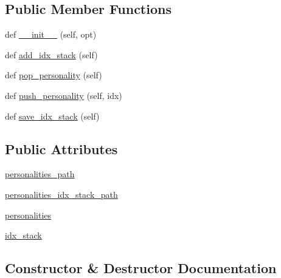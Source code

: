 \subsection*{Public Member Functions}
\begin{DoxyCompactItemize}
\item 
def \hyperlink{classpersonality__captions_1_1worlds_1_1PersonalityGenerator_a9964a939fc695387f9f3f4d30b8cea0f}{\+\_\+\+\_\+init\+\_\+\+\_\+} (self, opt)
\item 
def \hyperlink{classpersonality__captions_1_1worlds_1_1PersonalityGenerator_a78cf1854a907766176bd595a66e0b4c1}{add\+\_\+idx\+\_\+stack} (self)
\item 
def \hyperlink{classpersonality__captions_1_1worlds_1_1PersonalityGenerator_a5d77b6f2855f26f68832d81f4b84ba99}{pop\+\_\+personality} (self)
\item 
def \hyperlink{classpersonality__captions_1_1worlds_1_1PersonalityGenerator_a1a7e9fddde73adcfaf1fa9c82ae5a732}{push\+\_\+personality} (self, idx)
\item 
def \hyperlink{classpersonality__captions_1_1worlds_1_1PersonalityGenerator_a6234b41cdaf670fa367723cce5a47b8b}{save\+\_\+idx\+\_\+stack} (self)
\end{DoxyCompactItemize}
\subsection*{Public Attributes}
\begin{DoxyCompactItemize}
\item 
\hyperlink{classpersonality__captions_1_1worlds_1_1PersonalityGenerator_aab870fd5462e825716eb0e2a996671e2}{personalities\+\_\+path}
\item 
\hyperlink{classpersonality__captions_1_1worlds_1_1PersonalityGenerator_ad1e7cbf0a184bb37c8f5220218cbb524}{personalities\+\_\+idx\+\_\+stack\+\_\+path}
\item 
\hyperlink{classpersonality__captions_1_1worlds_1_1PersonalityGenerator_ad2e42bbbde55a18a9c10477bc5ac4b02}{personalities}
\item 
\hyperlink{classpersonality__captions_1_1worlds_1_1PersonalityGenerator_a75a92b71d3b65ebf571421dfc18d8d0c}{idx\+\_\+stack}
\end{DoxyCompactItemize}


\subsection{Constructor \& Destructor Documentation}
\mbox{\label{classpersonality__captions_1_1worlds_1_1PersonalityGenerator_a9964a939fc695387f9f3f4d30b8cea0f}} 
